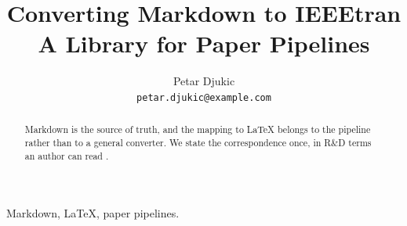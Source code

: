 \title{Converting Markdown to IEEEtran\\ \large A Library for Paper Pipelines}
\author{Petar Djukic\\ \texttt{petar.djukic@example.com}}
\maketitle
\begin{abstract}
Markdown is the source of truth, and the mapping to LaTeX belongs to the
pipeline rather than to a general converter. We state the correspondence
once, in R\&D terms an author can read \cite{du-2023}.
\end{abstract}
\begin{IEEEkeywords}
Markdown, LaTeX, paper pipelines.
\end{IEEEkeywords}
